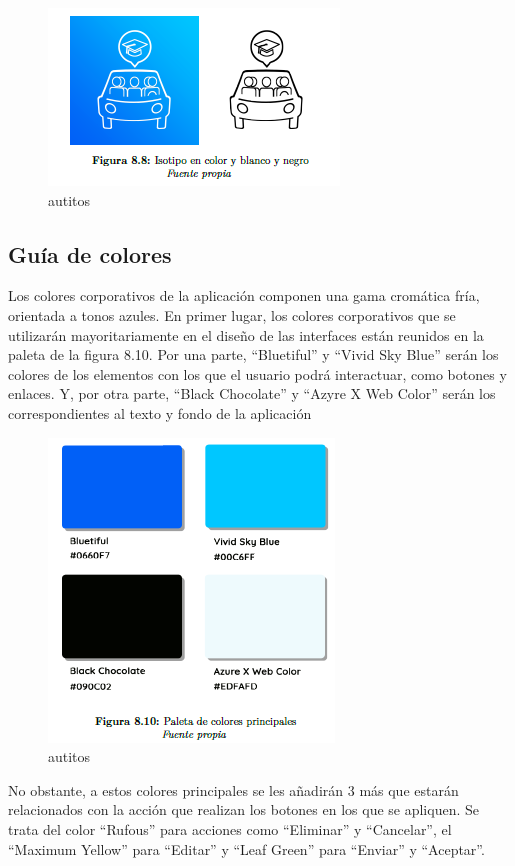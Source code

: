 \begin{figure}[H]
    \centering
    \includegraphics[scale=0.5]{figures/i11.png}
    \caption{autitos}
    \label{fig:i11}
\end{figure}

\subsection{Guía de colores}

Los colores corporativos de la aplicación componen una gama cromática fría, orientada a
tonos azules. En primer lugar, los colores corporativos que se utilizarán mayoritariamente en el diseño de las interfaces están reunidos en la paleta de la figura 8.10. Por una parte, “Bluetiful” y “Vivid Sky Blue” serán los colores de los elementos con los que el usuario podrá interactuar, como botones y enlaces. Y, por otra parte, “Black Chocolate” y “Azyre X Web Color” serán los correspondientes al texto y fondo de la aplicación

\begin{figure}[H]
    \centering
    \includegraphics[scale=0.5]{figures/i9.png}
    \caption{autitos}
    \label{fig:i9}
\end{figure}

No obstante, a estos colores principales se les añadirán 3 más que estarán relacionados con la acción que realizan los botones en los que se apliquen. Se trata del color “Rufous” para acciones como “Eliminar” y “Cancelar”, el “Maximum Yellow” para “Editar” y “Leaf Green” para “Enviar” y “Aceptar”.

